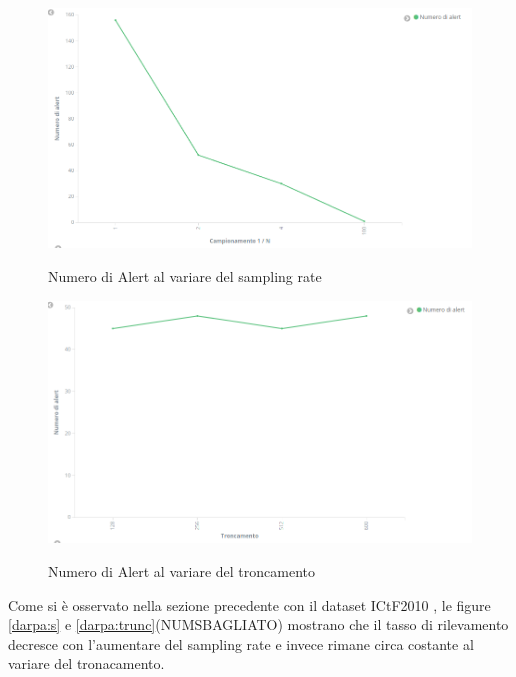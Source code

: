 \documentclass[12pt,a4paper,openright,twoside]{report}
\begin{document}
\begin{figure}[h!]
\begin{center}                          %
  \includegraphics[width=\textwidth]{images/DARPA-sampling-rate.png}
  \caption{Numero di Alert al variare del sampling rate}\label{darpa:s}
  \label{}
\end{center}
\end{figure}
\begin{figure}[h!]
\begin{center}                          %
  \includegraphics[width=\textwidth]{images/DARPA-troncamento.png}\label{darpa:trunc}
  \caption{Numero di Alert al variare del troncamento}
  \label{}
\end{center}
\end{figure}
 Come si \`e osservato nella sezione precedente con il dataset ICtF2010 , le figure \ref{darpa:s}
 e \ref{darpa:trunc}(NUMSBAGLIATO) mostrano che il tasso di rilevamento decresce con l'aumentare del
 sampling rate e invece rimane circa costante al variare del tronacamento.
\end{document}
